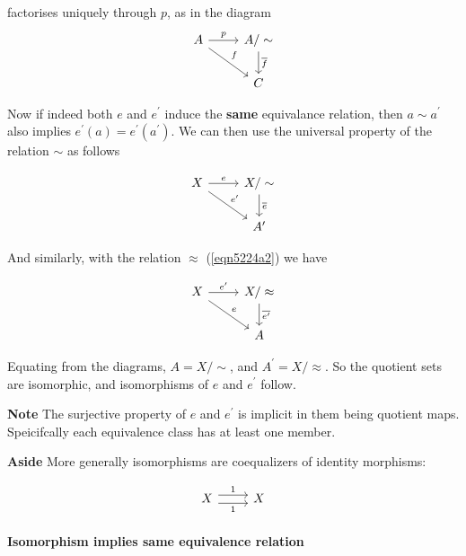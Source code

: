 \documentclass{article}
\begin{document}
factorises uniquely through $p$, as in the diagram
\begin{equation*}
\begin{tikzcd}
A \arrow[rd,"f"] \arrow[r, "p"] & A/\sim \arrow[d, "\overline{f}"] \\
& C
\end{tikzcd}
\end{equation*}

Now if indeed both $e$ and $e^\prime$ induce the \textbf{same} equivalance relation, then $a \sim a^\prime$ also implies $e^\prime(a) = e^\prime(a^\prime)$. We can then use the universal property of the relation $\sim$ as follows

\begin{equation*}
\begin{tikzcd}
X \arrow[rd,"e^\prime"] \arrow[r, "e"] & X/\sim \arrow[d, "\overline{e}"] \\
& A^\prime
\end{tikzcd}
\end{equation*}

And similarly, with the relation $\approx$ (\ref{eqn5224a2}) we have

\begin{equation*}
\begin{tikzcd}
X \arrow[rd,"e"] \arrow[r, "e^\prime"] & X/\approx \arrow[d, "\overline{e^\prime}"] \\
& A
\end{tikzcd}
\end{equation*}

Equating from the diagrams, $A=X/\sim$, and $A^\prime=X/\approx$. So the quotient sets are isomorphic, and isomorphisms of $e$ and $e^\prime$ follow.

\textbf{Note} The surjective property of $e$ and $e^\prime$ is implicit in them being quotient maps. Speicifcally each equivalence class has at least one member.

\textbf{Aside} More generally isomorphisms are coequalizers of identity morphisms:

\begin{equation*}
\label{eqn5143}
\begin{tikzcd}
  X \ar[r,shift left=.75ex,"1"]
    \ar[r,shift right=.75ex,swap,"1"] & X
\end{tikzcd}
\end{equation*}

\paragraph{Isomorphism implies same equivalence relation}
\end{document}
